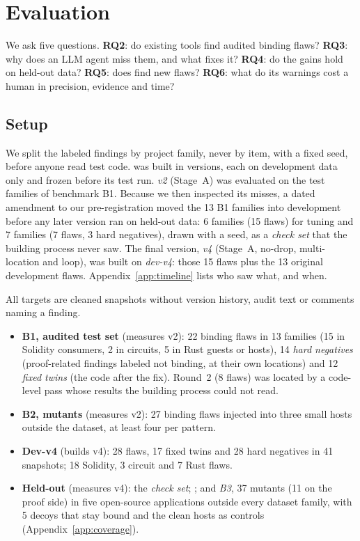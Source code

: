 \section{Evaluation}\label{sec:eval}

We ask five questions. \textbf{RQ2}: do existing tools find audited binding
flaws? \textbf{RQ3}: why does an LLM agent miss them, and what fixes it?
\textbf{RQ4}: do the gains hold on held-out data? \textbf{RQ5}: does \tool{}
find new flaws? \textbf{RQ6}: what do its warnings cost a human in precision,
evidence and time?

\subsection{Setup}\label{sec:eval-setup}

We split the labeled findings by project family, never by item, with a fixed
seed, before anyone read test code. \tool{} was built in versions, each on
development data only and frozen before its test run. \emph{v2} (Stage~A)
was evaluated on the test families of benchmark B1. Because we then inspected
its misses, a dated amendment to our pre-registration moved the 13 B1
families into development before any later version ran on held-out data: 6
families (15 flaws) for tuning and 7 families (7 flaws, 3 hard negatives),
drawn with a seed, as a \emph{check set} that the building process never saw.
The final version, \emph{v4} (Stage~A, no-drop, multi-location and loop), was
built on \emph{dev-v4}: those 15 flaws plus the 13 original development flaws.
Appendix~\ref{app:timeline} lists who saw what, and when.

All targets are cleaned snapshots without version history, audit text or
comments naming a finding.
\begin{itemize}
\item \textbf{B1, audited test set} (measures v2): 22 binding flaws in 13
families (15 in Solidity consumers, 2 in circuits, 5 in Rust guests or hosts),
14 \emph{hard negatives} (proof-related findings labeled not binding, at their
own locations) and 12 \emph{fixed twins} (the code after the fix). Round~2 (8
flaws) was located by a code-level pass whose results the building process
could not read.
\item \textbf{B2, mutants} (measures v2): 27 binding flaws injected into three
small hosts outside the dataset, at least four per pattern.
\item \textbf{Dev-v4} (builds v4): 28 flaws, 17 fixed twins and 28 hard
negatives in 41 snapshots; 18 Solidity, 3 circuit and 7 Rust flaws.
\item \textbf{Held-out} (measures v4): the \emph{check set}; ; and \emph{B3}, 37 mutants (11 on the proof side) in five open-source
applications outside every dataset family, with 5 decoys that stay bound and
the clean hosts as controls (Appendix~\ref{app:coverage}).
\end{itemize}

